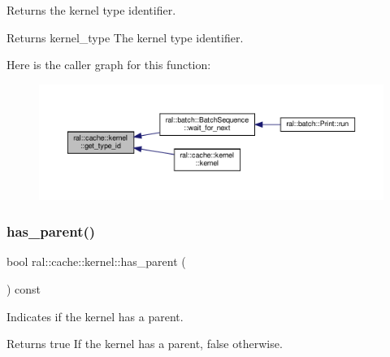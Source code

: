 Returns the kernel type identifier. 

\begin{DoxyReturn}{Returns}
kernel\+\_\+type The kernel type identifier. 
\end{DoxyReturn}
Here is the caller graph for this function\+:\nopagebreak
\begin{figure}[H]
\begin{center}
\leavevmode
\includegraphics[width=350pt]{classral_1_1cache_1_1kernel_a146246668880ca685f22d208e638578b_icgraph}
\end{center}
\end{figure}
\mbox{\label{classral_1_1cache_1_1kernel_a21dc72f0714ddc2b4b2187592d05ba77}} 
\subsubsection{\texorpdfstring{has\+\_\+parent()}{has\_parent()}}
{\footnotesize\ttfamily bool ral\+::cache\+::kernel\+::has\+\_\+parent (\begin{DoxyParamCaption}{ }\end{DoxyParamCaption}) const\hspace{0.3cm}{\ttfamily [inline]}}



Indicates if the kernel has a parent. 

\begin{DoxyReturn}{Returns}
true If the kernel has a parent, false otherwise. 
\end{DoxyReturn}
\mbox{\label{classral_1_1cache_1_1kernel_a75d3db3d361445cd14da3186b8b15036}} 
